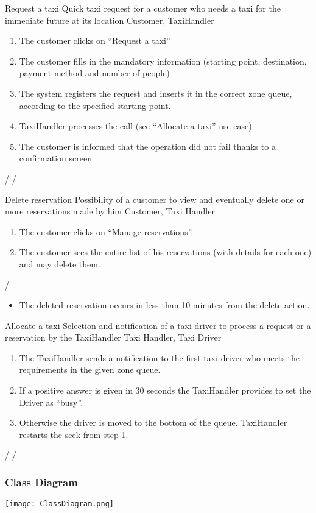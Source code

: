 
\usecase
{Request a taxi}
{Quick taxi request for a customer who needs a taxi for the immediate future at its location}
{Customer, TaxiHandler}
{
\begin{enumerate}
	\item The customer clicks on ``Request a taxi''
	\item The customer fills in the mandatory information (starting point, destination, payment method and number of people)
	\item The system registers the request and inserts it in the correct zone queue, according to the specified starting point.
	\item TaxiHandler processes the call (see ``Allocate a taxi'' use case)
	\item The customer is informed that the operation did not fail thanks to a confirmation screen
\end{enumerate}
}
{
/
}
{ 
/
}

\pagebreak
{}

\usecase
{Delete reservation}
{Possibility of a customer to view and eventually delete one or more reservations made by him}
{Customer, Taxi Handler}
{
\begin{enumerate}
	\item The customer clicks on ``Manage reservations''.
	\item The customer sees the entire list of his reservations (with details for each one) and may delete them.
\end{enumerate}
}
{
/
}
{ 
\begin{itemize}
	\item The deleted reservation occurs in less than 10 minutes from the delete action.
\end{itemize}
}

\pagebreak
{}
\pagebreak
\usecase
{Allocate a taxi}
{Selection and notification of a taxi driver to process a request or a reservation by the TaxiHandler}
{Taxi Handler, Taxi Driver}
{
\begin{enumerate}
	\item The TaxiHandler sends a notification to the first taxi driver who meets the requirements in the given zone queue.
	\item If a positive answer is given in 30 seconds the TaxiHandler provides to set the Driver as ``busy''.
	\item Otherwise the driver is moved to the bottom of the queue. TaxiHandler restarts the seek from step 1.
\end{enumerate}
}
{
/
}
{ 
/
}

\pagebreak
{}

\pagebreak
\subsubsection{Class Diagram}
\texttt{[image: ClassDiagram.png]}
